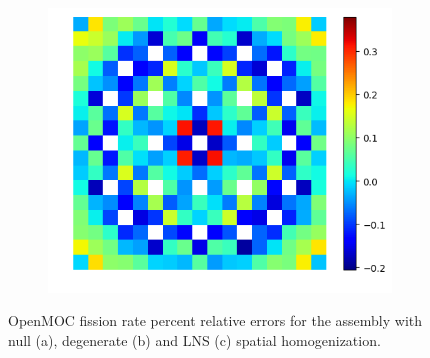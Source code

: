 \begin{figure}[H]
\begin{subfigure}{0.45\textwidth}
  \centering
  \includegraphics[width=\linewidth]{figures/assembly/fiss-lns-errors}
  \caption{}
  \label{fig:assm-fiss-lns-error}
\end{subfigure}
\caption{OpenMOC fission rate percent relative errors for the assembly with null (a), degenerate (b) and LNS (c) spatial homogenization.}
\label{fig:assm-fiss-errors}
\end{figure}

